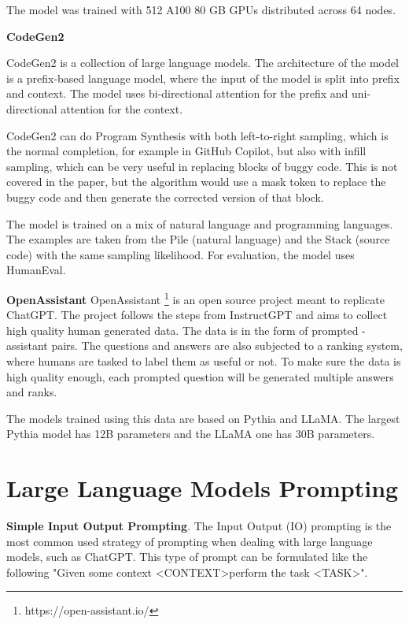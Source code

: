 \documentclass[12pt,a4paper]{report}
\begin{document}
The model was trained with 512 A100 80 GB GPUs distributed across 64 nodes.

\textbf{CodeGen2}

CodeGen2 \cite{nijkamp2023codegen2} is a collection of large language models. The architecture of the model is a prefix-based language model, where the input of the model is split into prefix and context. The model uses bi-directional attention for the prefix and uni-directional attention for the context.

CodeGen2 can do Program Synthesis with both left-to-right sampling, which is the normal completion, for example in GitHub Copilot, but also with infill sampling, which can be very useful in replacing blocks of buggy code. This is not covered in the paper, but the algorithm would use a mask token to replace the buggy code and then generate the corrected version of that block.

The model is trained on a mix of natural language and programming languages. The examples are taken from the Pile (natural language) and the Stack (source code) with the same sampling likelihood. For evaluation, the model uses HumanEval.

\textbf{OpenAssistant} OpenAssistant \footnote{https://open-assistant.io/} is an open source project meant to replicate ChatGPT. The project follows the steps from InstructGPT \cite{ouyang2022training} and aims to collect high quality human generated data. The data is in the form of prompted - assistant pairs. The questions and answers are also subjected to a ranking system, where humans are tasked to label them as useful or not. To make sure the data is high quality enough, each prompted question will be generated multiple answers and ranks. 

The models trained using this data are based on Pythia and LLaMA. The largest Pythia model has 12B parameters and the LLaMA one has 30B parameters. 

\section{Large Language Models Prompting}

\textbf{Simple Input Output Prompting}. The Input Output (IO) prompting is the most common used strategy of prompting when dealing with large language models, such as ChatGPT. This type of prompt can be formulated like the following "Given some context \textless{CONTEXT}\textgreater perform the task \textless{TASK}\textgreater".
\end{document}
